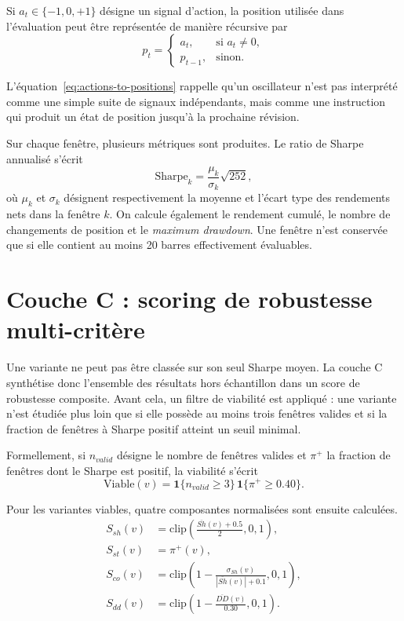 Si \(a_t\in\{-1,0,+1\}\) désigne un signal d'action, la position utilisée dans
l'évaluation peut être représentée de manière récursive par
\begin{equation}
p_t =
\begin{cases}
a_t, & \text{si } a_t \neq 0,\\
p_{t-1}, & \text{sinon.}
\end{cases}
\label{eq:actions-to-positions}
\end{equation}

L'équation~\ref{eq:actions-to-positions} rappelle qu'un oscillateur n'est pas
interprété comme une simple suite de signaux indépendants, mais comme une
instruction qui produit un état de position jusqu'à la prochaine révision.

Sur chaque fenêtre, plusieurs métriques sont produites. Le ratio de Sharpe
annualisé s'écrit
\begin{equation}
\mathrm{Sharpe}_k = \frac{\mu_k}{\sigma_k}\sqrt{252},
\label{eq:sharpe-window}
\end{equation}
où \(\mu_k\) et \(\sigma_k\) désignent respectivement la moyenne et l'écart
type des rendements nets dans la fenêtre \(k\). On calcule également le rendement
cumulé, le nombre de changements de position et le \emph{maximum drawdown}. Une
fenêtre n'est conservée que si elle contient au moins 20 barres effectivement
évaluables.

\section{Couche C : scoring de robustesse multi-critère}
Une variante ne peut pas être classée sur son seul Sharpe moyen. La couche C
synthétise donc l'ensemble des résultats hors échantillon dans un score de
robustesse composite. Avant cela, un filtre de viabilité est appliqué : une
variante n'est étudiée plus loin que si elle possède au moins trois fenêtres
valides et si la fraction de fenêtres à Sharpe positif atteint un seuil minimal.

Formellement, si \(n_{valid}\) désigne le nombre de fenêtres valides et
\(\pi^{+}\) la fraction de fenêtres dont le Sharpe est positif, la viabilité
s'écrit
\begin{equation}
\mathrm{Viable}(v)=\mathbf{1}\{n_{valid}\geq 3\}\,\mathbf{1}\{\pi^{+}\geq 0.40\}.
\label{eq:viability-gate}
\end{equation}

Pour les variantes viables, quatre composantes normalisées sont ensuite calculées.
\begin{align}
S_{sh}(v) &= \mathrm{clip}\!\left(\frac{\overline{Sh}(v)+0.5}{2},0,1\right), \\
S_{st}(v) &= \pi^{+}(v), \\
S_{co}(v) &= \mathrm{clip}\!\left(1-\frac{\sigma_{Sh}(v)}{|\overline{Sh}(v)|+0.1},0,1\right), \\
S_{dd}(v) &= \mathrm{clip}\!\left(1-\frac{\overline{DD}(v)}{0.30},0,1\right).
\end{align}

